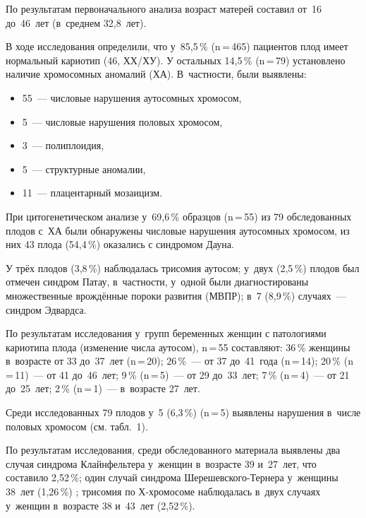 По результатам первоначального анализа возраст матерей составил от~16 до~46~лет (в~среднем 32,8~лет).

В ходе исследования определили, что у~85,5\,\% (n\,=\,465) пациентов плод имеет нормальный кариотип (46, ХХ/ХУ). У остальных 14,5\,\% (n\,=\,79) установлено наличие хромосомных аномалий (ХА). В~частности, были выявлены:
\begin{itemize}[noitemsep]\vspace{-10pt}
  \item 55~--- числовые нарушения аутосомных хромосом,
\item  5~--- числовые нарушения половых хромосом,
\item  3~--- полиплоидия,
\item  5~--- структурные аномалии,
\item  11~--- плацентарный мозаицизм.
\end{itemize}
\vspace{-10pt}

При цитогенетическом анализе у~69,6\,\% образцов (n\,=\,55) из 79 обследованных плодов с~ХА были обнаружены числовые нарушения аутосомных хромосом, из них 43 плода (54,4\,\%) оказались с синдромом Дауна.

У трёх плодов (3,8\,\%) наблюдалась трисомия аутосом; у~двух (2,5\,\%) плодов был отмечен синдром Патау, в~частности, у~одной были диагностированы множественные врождённые пороки развития (МВПР); в~7 (8,9\,\%) случаях~--- синдром Эдвардса.

По результатам исследования у~групп беременных женщин с патологиями кариотипа плода (изменение числа аутосом), n\,=\,55 составляют: 36\,\% женщины в~возрасте от 33 до~37~лет (n\,=\,20); 26\,\%~--- от 37 до~41~года (n\,=\,14); 20\,\% (n\,=\,11)~--- от 41 до~46~лет; 9\,\% (n\,=\,5)~--- от 29 до~33~лет; 7\,\% (n\,=\,4)~--- от 21 до~25~лет; 2\,\% (n\,=\,1)~--- в~возрасте 27~лет.


Среди исследованных 79 плодов у~5 (6,3\,\%) (n\,=\,5) выявлены нарушения в~числе половых хромосом (см. табл.~1).



По результатам исследования, среди обследованного материала выявлены два случая синдрома Клайнфельтера у~женщин в~возрасте 39 и~27~лет, что составило 2,52\,\%; \enlargethispage{2\baselineskip}один случай синдрома Шерешевского-Тернера у~женщины 38~лет (1,26\,\%) ; трисомия по Х-хромосоме наблюдалась в~двух случаях у~женщин в~возрасте 38 и~43~лет (2,52\,\%).

